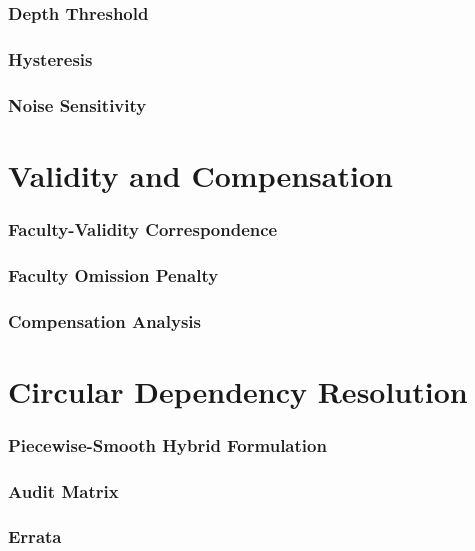 \documentclass[manuscript,screen]{jair}
\begin{document}
\section{Depth Threshold}


\section{Hysteresis}


\section{Noise Sensitivity}


\part{Validity and Compensation}

\section{Faculty-Validity Correspondence}


\section{Faculty Omission Penalty}


\section{Compensation Analysis}


\part{Circular Dependency Resolution}

\section{Piecewise-Smooth Hybrid Formulation}


\appendix
\section{Audit Matrix}


\section{Errata}



\end{document}
